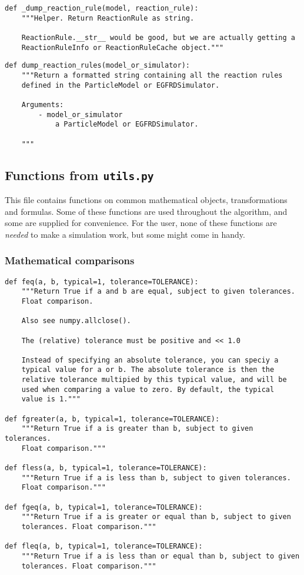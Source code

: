 \documentclass[a4paper,10pt]{article}
\begin{document}
\begin{verbatim}
def _dump_reaction_rule(model, reaction_rule):
    """Helper. Return ReactionRule as string.

    ReactionRule.__str__ would be good, but we are actually getting a 
    ReactionRuleInfo or ReactionRuleCache object."""
\end{verbatim}

\begin{verbatim}
def dump_reaction_rules(model_or_simulator):
    """Return a formatted string containing all the reaction rules 
    defined in the ParticleModel or EGFRDSimulator.

    Arguments:
        - model_or_simulator
            a ParticleModel or EGFRDSimulator.

    """
\end{verbatim}

\subsection{Functions from \texttt{utils.py}}

This file contains functions on common mathematical objects, transformations and formulas. Some of these functions are used throughout the algorithm, and some are supplied for convenience. 
For the user, none of these functions are \textit{needed} to make a simulation work, but some might come in handy.

\subsubsection{Mathematical comparisons}
\begin{verbatim}
def feq(a, b, typical=1, tolerance=TOLERANCE):
    """Return True if a and b are equal, subject to given tolerances.  
    Float comparison.

    Also see numpy.allclose().

    The (relative) tolerance must be positive and << 1.0

    Instead of specifying an absolute tolerance, you can speciy a 
    typical value for a or b. The absolute tolerance is then the 
    relative tolerance multipied by this typical value, and will be 
    used when comparing a value to zero. By default, the typical 
    value is 1."""

def fgreater(a, b, typical=1, tolerance=TOLERANCE):
    """Return True if a is greater than b, subject to given tolerances.  
    Float comparison."""

def fless(a, b, typical=1, tolerance=TOLERANCE):
    """Return True if a is less than b, subject to given tolerances.  
    Float comparison."""

def fgeq(a, b, typical=1, tolerance=TOLERANCE):
    """Return True if a is greater or equal than b, subject to given 
    tolerances. Float comparison."""

def fleq(a, b, typical=1, tolerance=TOLERANCE):
    """Return True if a is less than or equal than b, subject to given 
    tolerances. Float comparison."""

\end{verbatim}
\end{document}
